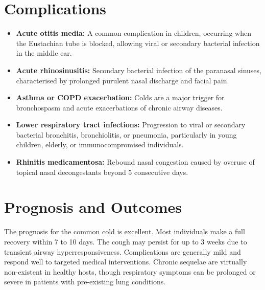 \section*{Complications}
\begin{itemize}
    \item \textbf{Acute otitis media:} A common complication in children, occurring when the Eustachian tube is blocked, allowing viral or secondary bacterial infection in the middle ear.
    \item \textbf{Acute rhinosinusitis:} Secondary bacterial infection of the paranasal sinuses, characterised by prolonged purulent nasal discharge and facial pain.
    \item \textbf{Asthma or COPD exacerbation:} Colds are a major trigger for bronchospasm and acute exacerbations of chronic airway diseases.
    \item \textbf{Lower respiratory tract infections:} Progression to viral or secondary bacterial bronchitis, bronchiolitis, or pneumonia, particularly in young children, elderly, or immunocompromised individuals.
    \item \textbf{Rhinitis medicamentosa:} Rebound nasal congestion caused by overuse of topical nasal decongestants beyond 5 consecutive days.
\end{itemize}

\section*{Prognosis and Outcomes}
The prognosis for the common cold is excellent. Most individuals make a full recovery within 7 to 10 days. The cough may persist for up to 3 weeks due to transient airway hyperresponsiveness. Complications are generally mild and respond well to targeted medical interventions. Chronic sequelae are virtually non-existent in healthy hosts, though respiratory symptoms can be prolonged or severe in patients with pre-existing lung conditions.

